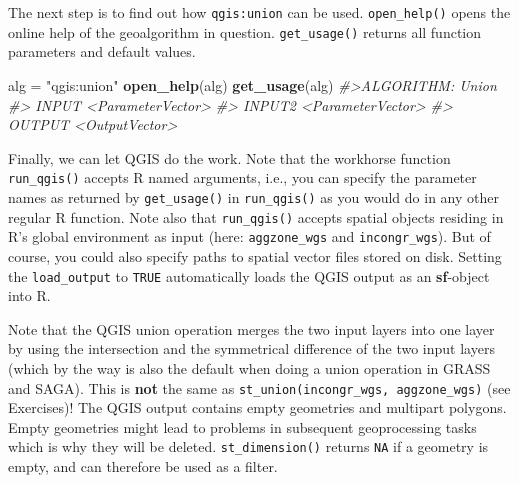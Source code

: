\documentclass[]{krantz}
\newenvironment{Shaded}{\begin{snugshade}}{\end{snugshade}}
\newcommand{\CommentTok}[1]{\textcolor[rgb]{0.37,0.37,0.37}{\textit{#1}}}
\newcommand{\DataTypeTok}[1]{\textcolor[rgb]{0.27,0.27,0.27}{#1}}
\newcommand{\KeywordTok}[1]{\textcolor[rgb]{0.27,0.27,0.27}{\textbf{#1}}}
\newcommand{\NormalTok}[1]{#1}
\newcommand{\OtherTok}[1]{\textcolor[rgb]{0.37,0.37,0.37}{#1}}
\newcommand{\StringTok}[1]{\textcolor[rgb]{0.5,0.5,0.5}{#1}}
\begin{document}
The next step is to find out how \texttt{qgis:union} can be used.
\texttt{open\_help()} opens the online help of the geoalgorithm in question.
\texttt{get\_usage()} returns all function parameters and default values.

\begin{Shaded}
\begin{Highlighting}[]
\NormalTok{alg =}\StringTok{ "qgis:union"}
\KeywordTok{open_help}\NormalTok{(alg)}
\KeywordTok{get_usage}\NormalTok{(alg)}
\CommentTok{#>ALGORITHM: Union}
\CommentTok{#>  INPUT <ParameterVector>}
\CommentTok{#>  INPUT2 <ParameterVector>}
\CommentTok{#>  OUTPUT <OutputVector>}
\end{Highlighting}
\end{Shaded}

Finally, we can let QGIS do the work.
Note that the workhorse function \texttt{run\_qgis()} accepts R named arguments, i.e., you can specify the parameter names as returned by \texttt{get\_usage()} in \texttt{run\_qgis()} as you would do in any other regular R function.
Note also that \texttt{run\_qgis()} accepts spatial objects residing in R's global environment as input (here: \texttt{aggzone\_wgs} and \texttt{incongr\_wgs}).
But of course, you could also specify paths to spatial vector files stored on disk.
Setting the \texttt{load\_output} to \texttt{TRUE} automatically loads the QGIS output as an \textbf{sf}-object into R.

\begin{Shaded}
\end{Shaded}

Note that the QGIS union operation merges the two input layers into one layer by using the intersection and the symmetrical difference of the two input layers (which by the way is also the default when doing a union operation in GRASS and SAGA).
This is \textbf{not} the same as \texttt{st\_union(incongr\_wgs,\ aggzone\_wgs)} (see Exercises)!
The QGIS output contains empty geometries and multipart polygons.
Empty geometries might lead to problems in subsequent geoprocessing tasks which is why they will be deleted.
\texttt{st\_dimension()} returns \texttt{NA} if a geometry is empty, and can therefore be used as a filter.
\end{document}
